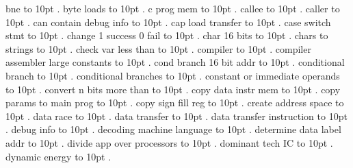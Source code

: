 \smallskip
bne \leaders\hbox to 10pt {\hss.\hss}  \hfill {}
\smallskip
byte loads \leaders\hbox to 10pt {\hss.\hss}  \hfill {}
\smallskip
c prog mem \leaders\hbox to 10pt {\hss.\hss}  \hfill {}
\smallskip
callee \leaders\hbox to 10pt {\hss.\hss}  \hfill {}
\smallskip
caller \leaders\hbox to 10pt {\hss.\hss}  \hfill {}
\smallskip
can contain debug info \leaders\hbox to 10pt {\hss.\hss}  \hfill {}
\smallskip
cap load transfer \leaders\hbox to 10pt {\hss.\hss}  \hfill {}
\smallskip
case switch stmt \leaders\hbox to 10pt {\hss.\hss}  \hfill {}
\smallskip
change 1 success 0 fail \leaders\hbox to 10pt {\hss.\hss}  \hfill {}
\smallskip
char 16 bits \leaders\hbox to 10pt {\hss.\hss}  \hfill {}
\smallskip
chars to strings \leaders\hbox to 10pt {\hss.\hss}  \hfill {}
\smallskip
check var less than \leaders\hbox to 10pt {\hss.\hss}  \hfill {}
\smallskip
compiler \leaders\hbox to 10pt {\hss.\hss}  \hfill {}
\smallskip
compiler assembler large constants \leaders\hbox to 10pt {\hss.\hss}  \hfill {}
\smallskip
cond branch 16 bit addr \leaders\hbox to 10pt {\hss.\hss}  \hfill {}
\smallskip
conditional branch \leaders\hbox to 10pt {\hss.\hss}  \hfill {}
\smallskip
conditional branches \leaders\hbox to 10pt {\hss.\hss}  \hfill {}
\smallskip
constant or immediate operands \leaders\hbox to 10pt {\hss.\hss}  \hfill {}
\smallskip
convert n bits more than \leaders\hbox to 10pt {\hss.\hss}  \hfill {}
\smallskip
copy data instr mem \leaders\hbox to 10pt {\hss.\hss}  \hfill {}
\smallskip
copy params to main prog \leaders\hbox to 10pt {\hss.\hss}  \hfill {}
\smallskip
copy sign fill reg \leaders\hbox to 10pt {\hss.\hss}  \hfill {}
\smallskip
create address space \leaders\hbox to 10pt {\hss.\hss}  \hfill {}
\smallskip
data race \leaders\hbox to 10pt {\hss.\hss}  \hfill {}
\smallskip
data transfer \leaders\hbox to 10pt {\hss.\hss}  \hfill {}
\smallskip
data transfer instruction \leaders\hbox to 10pt {\hss.\hss}  \hfill {}
\smallskip
debug info \leaders\hbox to 10pt {\hss.\hss}  \hfill {}
\smallskip
decoding machine language \leaders\hbox to 10pt {\hss.\hss}  \hfill {}
\smallskip
determine data label addr \leaders\hbox to 10pt {\hss.\hss}  \hfill {}
\smallskip
divide app over processors \leaders\hbox to 10pt {\hss.\hss}  \hfill {}
\smallskip
dominant tech IC \leaders\hbox to 10pt {\hss.\hss}  \hfill {}
\smallskip
dynamic energy \leaders\hbox to 10pt {\hss.\hss}  \hfill {}
